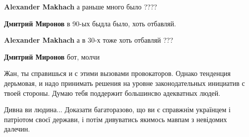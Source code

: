 \begin{itemize}
\begin{itemize}
\textbf{Alexander Makhach} а раньше много было ????

 
\textbf{Дмитрий Миронов} в 90-ых быдла было, хоть отбавляй.

 
\textbf{Alexander Makhach} а в 30-х тоже хоть отбавляй ???

 
\textbf{Дмитрий Миронов} бот, молчи
\end{itemize}

 

Жан, ты справишься и с этими вызовами провокаторов. Однако тенденция дерьмовая,
и надо принимать решения на уровне законодательных инициатив с твоей стороны.
Думаю тебя поддержит большинсво адекватных людей.


 

Дивна ви людина... Доказати багаторазово, що ви є справжнім українцем і патріотом
своєї держави, і потім дивуватись якимось мавпам з невідомих далечин.


 


\end{itemize}

